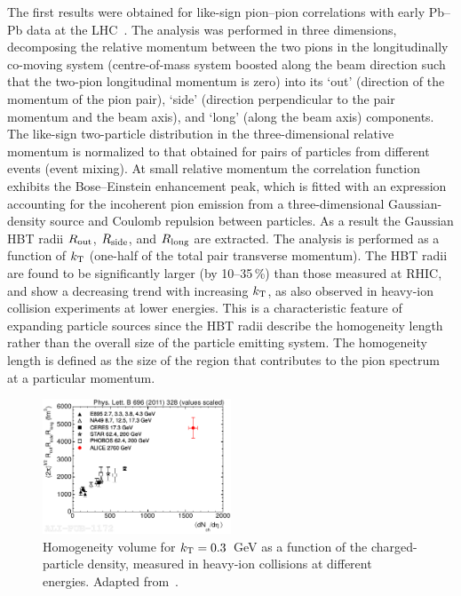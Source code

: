 The first results were obtained for like-sign pion--pion correlations with early Pb--Pb data at the LHC~\cite{}. The analysis was performed in three dimensions, decomposing the relative momentum between the two pions in the longitudinally co-moving system (centre-of-mass system boosted along the beam direction such that the two-pion longitudinal momentum is zero) into its `out' (direction of the momentum of the pion pair), `side' (direction perpendicular to the pair momentum and the beam axis), and `long' (along the beam axis) components. The like-sign two-particle distribution in the three-dimensional relative momentum is normalized to that obtained for pairs of particles from different events (event mixing). At small relative momentum the correlation function exhibits the Bose--Einstein enhancement peak, which is fitted with an expression accounting for the incoherent pion emission from a three-dimensional Gaussian-density source and Coulomb repulsion between particles. As a result the Gaussian HBT radii $R_{\rm out}$, $R_{\rm side}$, and $R_{\rm long}$ are extracted. The analysis is performed as a function of $k_{\rm T}$ (one-half of the total pair transverse momentum). The HBT radii are found to be significantly larger (by 10--35\,\%) than those measured at RHIC, and show a decreasing trend with increasing $k_{\rm T}$, as also observed in heavy-ion collision experiments at lower energies. This is a characteristic feature of expanding particle sources since the HBT radii describe the homogeneity length rather than the overall size of the particle emitting system. The homogeneity length is defined as the size of the region that contributes to the pion spectrum at a particular momentum.

\begin{figure}
\centering
\includegraphics[width=0.5\textwidth]{ksfigures/HBTVolumeVsDensity.pdf}
\caption{Homogeneity volume for $k_{\rm T} = 0.3$~GeV as a function of the charged-particle density, measured in heavy-ion collisions at different energies. Adapted from~\cite{}.}
\label{figks:HBTvolume}
\end{figure}

